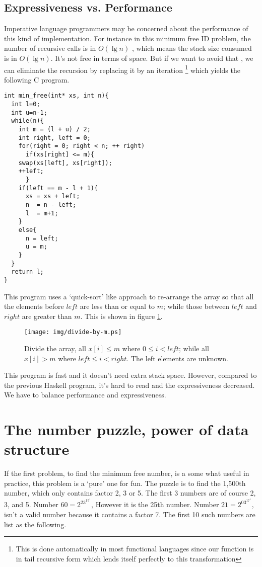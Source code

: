 \documentclass{article}
\begin{document}
\subsection{Expressiveness vs. Performance}
Imperative language programmers may be concerned about the performance
of this kind of implementation. For instance in this minimum
free ID problem, the number of recursive calls is in $O(\lg n)$
, which means the stack size consumed is in $O(\lg n)$.
It's not free in terms of space. But if we want to avoid that
, we can eliminate the recursion by replacing it by an iteration
\footnote{This is done automatically in most functional languages
since our function is in tail recursive form which lends itself
perfectly to this transformation} which yields the following C program.

\lstset{language=C}
\begin{lstlisting}
int min_free(int* xs, int n){
  int l=0;
  int u=n-1;
  while(n){
    int m = (l + u) / 2;
    int right, left = 0;
    for(right = 0; right < n; ++ right)
      if(xs[right] <= m){
	swap(xs[left], xs[right]);
	++left;
      }
    if(left == m - l + 1){
      xs = xs + left;
      n  = n - left;
      l  = m+1;
    }
    else{
      n = left;
      u = m;
    }
  }
  return l;
}
\end{lstlisting}

This program uses a `quick-sort' like approach to re-arrange the
array so that all the elements before $left$ are less than or equal
to $m$; while those between $left$ and $right$ are greater
than $m$. This is shown in figure \ref{fig:divide}.

\begin{figure}[htbp]
  \centering
  \texttt{[image: img/divide-by-m.ps]}
  \caption{Divide the array, all $x[i] \leq m$ where $0 \leq i < left$; while all $x[i] > m$ where $left \leq i < right$. The left elements are unknown.} \label{fig:divide}
\end{figure}

This program is fast and it doesn't need extra stack space. However,
compared to the previous Haskell program, it's hard to read and the
expressiveness decreased. We have to balance performance
and expressiveness.

\section{The number puzzle, power of data structure}

If the first problem, to find the minimum free number, is a some what
useful in practice, this problem is a `pure' one for fun. The puzzle
is to find the 1,500th number, which only contains factor 2, 3 or 5.
The first 3 numbers are of course 2, 3, and 5. Number $60 = 2^23^15^1$,
However it is the 25th number. Number $21 = 2^03^17^1$, isn't a valid
number because it contains a factor 7. The first 10 such numbers are list
as the following.
\end{document}
